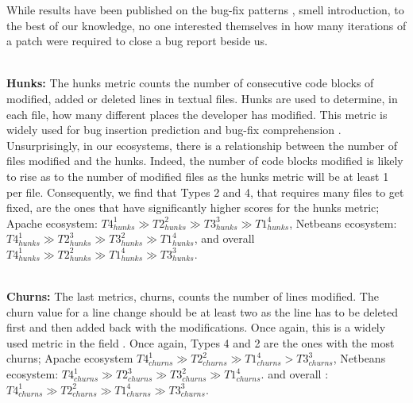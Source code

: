 While results have been published on the bug-fix patterns \cite{Pan2008}, smell introduction\cite{Tufano2015, Eyolfson2011}, to the best of our knowledge, no one interested themselves in how many iterations of a patch were required to close a bug report beside us.

\\ \vspace{0.1cm} {\bf Hunks: } The hunks metric counts the number of consecutive code blocks of modified, added or deleted lines in textual files.
Hunks are used to determine, in each file, how many different places the developer has modified.
This metric is widely used for bug insertion prediction \cite{Kim2006,Jung2009, Rosen2015} and bug-fix comprehension \cite{Pan2008}.
Unsurprisingly, in our ecosystems, there is a relationship between the number of files modified and the hunks.
Indeed, the number of code blocks modified is likely to rise as to the number of modified files as the hunks metric will be at least 1 per file.
Consequently, we find that Types 2 and 4, that requires many files to get fixed, are the ones that have significantly higher scores for the hunks metric; Apache ecosystem:
$
T4_{hunks}^1
 \gg
T2_{hunks}^2
 \gg
T3_{hunks}^3
 \gg
T1_{hunks}^4
$,
Netbeans ecosystem:
$
T4_{hunks}^1
 \gg
T2_{hunks}^3
 \gg
T3_{hunks}^2
 \gg
T1_{hunks}^4
$,
and overall
$
T4_{hunks}^1
 \gg
T2_{hunks}^2
 \gg
T1_{hunks}^4
 \gg
T3_{hunks}^3
$.

\\ \vspace{0.1cm} {\bf Churns: } The last metrics, churns, counts the number of lines modified.
The churn value for a line change should be at least two as the line has to be deleted first and then added back with the modifications.
Once again, this is a widely used metric in the field \cite{Kim2006,Pan2008,Jung2009, Rosen2015}.
Once again, Types 4 and 2 are the ones with the most churns; Apache ecosystem
$
T4_{churns}^1
 \gg
T2_{churns}^2
 \gg
T1_{churns}^4
 >
T3_{churns}^3
$,
Netbeans ecosystem:
$
T4_{churns}^1
 \gg
T2_{churns}^3
 \gg
T3_{churns}^2
 \gg
T1_{churns}^4
$.
and overall :
$
T4_{churns}^1
 \gg
T2_{churns}^2
 \gg
T1_{churns}^4
 \gg
T3_{churns}^3
$.




